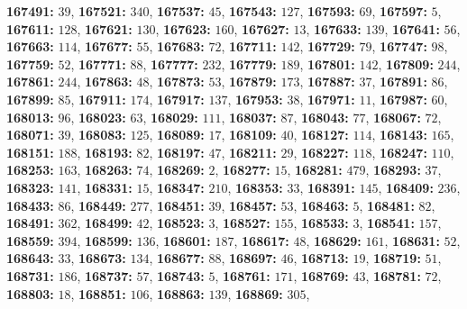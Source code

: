 \textsf{\bfseries 167491:} $39$, \textsf{\bfseries 167521:} $340$, \textsf{\bfseries 167537:} $45$, \textsf{\bfseries 167543:} $127$, \textsf{\bfseries 167593:} $69$, \textsf{\bfseries 167597:} $5$, \textsf{\bfseries 167611:} $128$, \textsf{\bfseries 167621:} $130$, \textsf{\bfseries 167623:} $160$, \textsf{\bfseries 167627:} $13$, \textsf{\bfseries 167633:} $139$, \textsf{\bfseries 167641:} $56$, \textsf{\bfseries 167663:} $114$, \textsf{\bfseries 167677:} $55$, \textsf{\bfseries 167683:} $72$, \textsf{\bfseries 167711:} $142$, \textsf{\bfseries 167729:} $79$, \textsf{\bfseries 167747:} $98$, \textsf{\bfseries 167759:} $52$, \textsf{\bfseries 167771:} $88$, \textsf{\bfseries 167777:} $232$, \textsf{\bfseries 167779:} $189$, \textsf{\bfseries 167801:} $142$, \textsf{\bfseries 167809:} $244$, \textsf{\bfseries 167861:} $244$, \textsf{\bfseries 167863:} $48$, \textsf{\bfseries 167873:} $53$, \textsf{\bfseries 167879:} $173$, \textsf{\bfseries 167887:} $37$, \textsf{\bfseries 167891:} $86$, \textsf{\bfseries 167899:} $85$, \textsf{\bfseries 167911:} $174$, \textsf{\bfseries 167917:} $137$, \textsf{\bfseries 167953:} $38$, \textsf{\bfseries 167971:} $11$, \textsf{\bfseries 167987:} $60$, \textsf{\bfseries 168013:} $96$, \textsf{\bfseries 168023:} $63$, \textsf{\bfseries 168029:} $111$, \textsf{\bfseries 168037:} $87$, \textsf{\bfseries 168043:} $77$, \textsf{\bfseries 168067:} $72$, \textsf{\bfseries 168071:} $39$, \textsf{\bfseries 168083:} $125$, \textsf{\bfseries 168089:} $17$, \textsf{\bfseries 168109:} $40$, \textsf{\bfseries 168127:} $114$, \textsf{\bfseries 168143:} $165$, \textsf{\bfseries 168151:} $188$, \textsf{\bfseries 168193:} $82$, \textsf{\bfseries 168197:} $47$, \textsf{\bfseries 168211:} $29$, \textsf{\bfseries 168227:} $118$, \textsf{\bfseries 168247:} $110$, \textsf{\bfseries 168253:} $163$, \textsf{\bfseries 168263:} $74$, \textsf{\bfseries 168269:} $2$, \textsf{\bfseries 168277:} $15$, \textsf{\bfseries 168281:} $479$, \textsf{\bfseries 168293:} $37$, \textsf{\bfseries 168323:} $141$, \textsf{\bfseries 168331:} $15$, \textsf{\bfseries 168347:} $210$, \textsf{\bfseries 168353:} $33$, \textsf{\bfseries 168391:} $145$, \textsf{\bfseries 168409:} $236$, \textsf{\bfseries 168433:} $86$, \textsf{\bfseries 168449:} $277$, \textsf{\bfseries 168451:} $39$, \textsf{\bfseries 168457:} $53$, \textsf{\bfseries 168463:} $5$, \textsf{\bfseries 168481:} $82$, \textsf{\bfseries 168491:} $362$, \textsf{\bfseries 168499:} $42$, \textsf{\bfseries 168523:} $3$, \textsf{\bfseries 168527:} $155$, \textsf{\bfseries 168533:} $3$, \textsf{\bfseries 168541:} $157$, \textsf{\bfseries 168559:} $394$, \textsf{\bfseries 168599:} $136$, \textsf{\bfseries 168601:} $187$, \textsf{\bfseries 168617:} $48$, \textsf{\bfseries 168629:} $161$, \textsf{\bfseries 168631:} $52$, \textsf{\bfseries 168643:} $33$, \textsf{\bfseries 168673:} $134$, \textsf{\bfseries 168677:} $88$, \textsf{\bfseries 168697:} $46$, \textsf{\bfseries 168713:} $19$, \textsf{\bfseries 168719:} $51$, \textsf{\bfseries 168731:} $186$, \textsf{\bfseries 168737:} $57$, \textsf{\bfseries 168743:} $5$, \textsf{\bfseries 168761:} $171$, \textsf{\bfseries 168769:} $43$, \textsf{\bfseries 168781:} $72$, \textsf{\bfseries 168803:} $18$, \textsf{\bfseries 168851:} $106$, \textsf{\bfseries 168863:} $139$, \textsf{\bfseries 168869:} $305$, 
